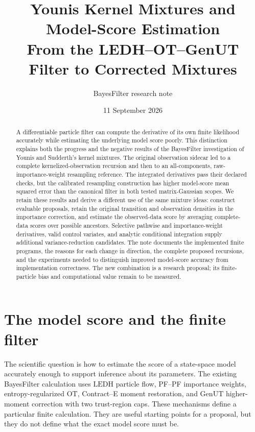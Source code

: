 \documentclass[11pt]{article}
\title{Younis Kernel Mixtures and Model-Score Estimation\\
From the LEDH--OT--GenUT Filter to Corrected Mixtures}
\author{BayesFilter research note}
\date{11 September 2026}
\newcommand{\LEDH}{\ensuremath{\mathrm{LEDH}}}
\newcommand{\GenUT}{\ensuremath{\mathrm{GenUT}}}
\newcommand{\OT}{\ensuremath{\mathrm{OT}}}
\begin{document}
\maketitle

\begin{abstract}
A differentiable particle filter can compute the derivative of its own
finite likelihood accurately while estimating the underlying model score
poorly. This distinction explains both the progress and the negative results
of the BayesFilter investigation of Younis and Sudderth's kernel mixtures.
The original observation sidecar led to a complete kernelized-observation
recursion and then to an all-components, raw-importance-weight resampling
reference. The integrated derivatives pass their declared checks, but the
calibrated resampling construction has higher model-score mean squared error
than the canonical filter in both tested matrix-Gaussian scopes. We retain
these results and derive a different use of the same mixture ideas: construct
evaluable proposals, retain the original transition and observation densities
in the importance correction, and estimate the observed-data score by
averaging complete-data scores over possible ancestors. Selective pathwise
and importance-weight derivatives, valid control variates, and analytic
conditional integration supply additional variance-reduction candidates.
The note documents the implemented finite programs, the reasons for each
change in direction, the complete proposed recursions, and the experiments
needed to distinguish improved model-score accuracy from implementation
correctness. The new combination is a research proposal; its finite-particle
bias and computational value remain to be measured.
\end{abstract}
\clearpage
\tableofcontents
\clearpage

\section{The model score and the finite filter}
\label{sec:question}

The scientific question is how to estimate the score of a state-space model
accurately enough to support inference about its parameters. The existing
BayesFilter calculation uses \LEDH{} particle flow, PF--PF importance weights,
entropy-regularized \OT{}, Contract--E moment restoration, and \GenUT{}
higher-moment correction with two trust-region caps. These mechanisms define
a particular finite calculation. They are useful starting points for a
proposal, but they do not define what the exact model score must be.
\end{document}
